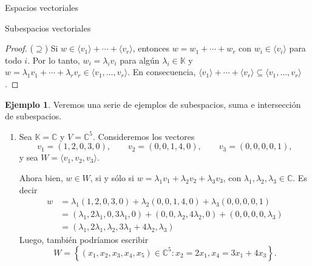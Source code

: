\documentclass[a4paper,12pt,twoside,spanish,reqno]{amsbook}
\theoremstyle{definition}
\newtheorem{ejemplo}{Ejemplo}[section]
\theoremstyle{remark}
\newcommand{\C}{\mathbb C}
\newcommand{\K}{\mathbb K}
\begin{document}
\begin{chapter}{Espacios vectoriales}
\begin{section}{Subespacios vectoriales}
\begin{proof}
		($\supseteq$) Si $w \in \langle v_1 \rangle+ \cdots + \langle v_r \rangle$, entonces $w = w_1 + \cdots+w_r$ con $w_i \in \langle v_i\rangle$ para todo $i$. Por lo tanto, $w_i = \lambda_i v_i$ para algún $\lambda_i \in \K$ y  $w = \lambda_1 v_1 +\cdots+ \lambda_r v_r \in \langle v_1,\ldots,v_r \rangle $. En  consecuencia, $\langle v_1 \rangle+ \cdots + \langle v_r \rangle \subseteq \langle v_1,\ldots,v_r \rangle$. 
	\end{proof}



		



	\begin{ejemplo}\label{ejemplos2} Veremos una serie de ejemplos de subespacios,  suma e intersección de subespacios.
		\begin{enumerate}
			\item\label{ejemplos2-1} Sea $\K = \C$ y $V= \C^5$. Consideremos los vectores
			\begin{equation*}
				v_1 = (1,2,0,3,0), \qquad v_2 = (0,0,1,4,0), \qquad v_3 = (0,0,0,0,1),
			\end{equation*}
			y sea $W= \langle v_1,v_2,v_3 \rangle$. 
			
			Ahora bien, $w \in W$, si y sólo si $w = \lambda_1 v_1+\lambda_2 v_2+\lambda_3 v_3$, con $\lambda_1,\lambda_2,\lambda_3 \in \C$. Es decir
			\begin{align*}
				w &= \lambda_1 (1,2,0,3,0)+\lambda_2 (0,0,1,4,0)+\lambda_3 (0,0,0,0,1) \\
				&=  (\lambda_1,2\lambda_1,0,3\lambda_1,0)+ (0,0,\lambda_2,4\lambda_2,0)+ (0,0,0,0,\lambda_3) \\ &=(\lambda_1,2\lambda_1,\lambda_2,3\lambda_1+4\lambda_2,\lambda_3)
			\end{align*} 
			Luego,  también podríamos escribir
			\begin{equation*}
				W = \left\{(x_1,x_2,x_3,x_4,x_5)\in \C^5: x_2 = 2x_1, x_4 = 3x_1+4x_3 \right\}.
			\end{equation*}
			

\end{enumerate}
\end{ejemplo}
\end{section}
\end{chapter}
\end{document}

